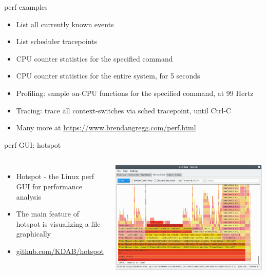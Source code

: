 \begin{frame}{perf examples}
  \begin{itemize}
  \item List all currently known events\\
  \item List scheduler tracepoints\\
  \item CPU counter statistics for the specified command\\
  \item CPU counter statistics for the entire system, for 5 seconds\\
  \item Profiling: sample on-CPU functions for the specified command, at 99 Hertz\\
  \item Tracing: trace all context-switches via sched tracepoint, until Ctrl-C\\
  \item Many more at \url{https://www.brendangregg.com/perf.html}
  \end{itemize}
\end{frame}

\begin{frame}{perf GUI: hotspot}
  \begin{columns}
    \begin{itemize}
    \item Hotspot - the Linux perf GUI for performance analysis
    \item The main feature of hotspot is visualizing a  file graphically
    \item \href{https://github.com/KDAB/hotspot}{github.com/KDAB/hotspot}
    \end{itemize}
    \includegraphics[width=\textwidth]{slides/linux-app-tracing/hotspot.png}
  \end{columns}
\end{frame}

